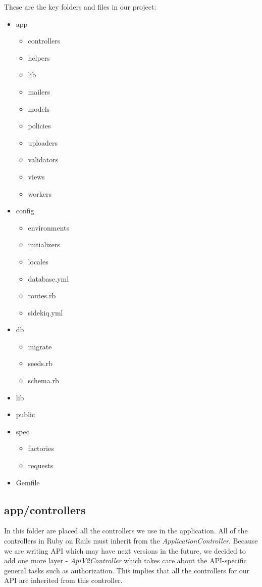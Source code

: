 	These are the key folders and files in our project: 
	\begin{itemize}
		\item app
			\begin{itemize}
				\item controllers
				\item helpers
				\item lib
				\item mailers
				\item models
				\item policies
				\item uploaders
				\item validators
				\item views
				\item workers
			\end{itemize}
		\item config \begin{itemize}
			\item environments
			\item initializers
			\item locales
			\item database.yml
			\item routes.rb
			\item sidekiq.yml
		\end{itemize}
		\item db \begin{itemize}
			\item migrate
			\item seeds.rb
			\item schema.rb
		\end{itemize}
		\item lib
		\item public
		\item spec \begin{itemize}
			\item factories
			\item requests
		\end{itemize}
		\item Gemfile
	\end{itemize}

	\subsection{app/controllers}
		In this folder are placed all the controllers we use in the application. All of the controllers in Ruby on Rails must inherit from the \textit{ApplicationController}. Because we are writing API which may have next versions in the future, we decided to add one more layer - \textit{ApiV2Controller} which takes care about the API-specific general tasks such as authorization. This implies that all the controllers for our API are inherited from this controller.
		
